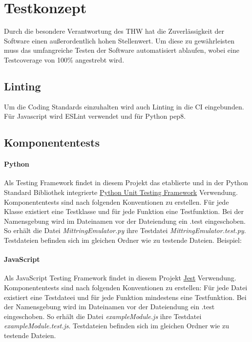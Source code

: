\section{Testkonzept}
Durch die besondere Verantwortung des THW hat die Zuverlässigkeit der Software einen außerordentlich hohen Stellenwert. Um diese zu gewährleisten muss das umfangreiche Testen der Software automatisiert ablaufen, wobei eine Testcoverage von 100\% angestrebt wird.
\subsection{Linting}
Um die Coding Standards einzuhalten wird auch Linting in die CI eingebunden. Für Javascript wird ESLint verwendet und für Python pep8.
\subsection{Komponententests}
\paragraph{Python}
Als Testing Framework findet in diesem Projekt das etablierte und in der Python Standard Bibliothek integrierte \href{https://docs.python.org/3/library/unittest.html}{Python Unit Testing Framework} Verwendung. Komponententests sind nach folgenden Konventionen zu erstellen. Für jede Klasse existiert eine Testklasse und für jede Funktion eine Testfunktion. Bei der Namensgebung wird im Dateinamen vor der Dateiendung ein .test eingeschoben. So erhält die Datei \textit{MittringEmulator.py} ihre Testdatei \textit{MittringEmulator.test.py}. Testdateien befinden sich im gleichen Ordner wie zu testende Dateien. Beispiel:
\paragraph{JavaScript}
Als JavaScript Testing Framework findet in diesem Projekt \href{https://facebook.github.io/jest/docs/en/getting-started.htmll}{Jest} Verwendung. Komponententests sind nach folgenden Konventionen zu erstellen: Für jede Datei existiert eine Testdateei und für jede Funktion mindestens eine Testfunktion. Bei der Namensgebung wird im Dateinamen vor der Dateiendung ein .test eingeschoben. So erhält die Datei \textit{exampleModule.js} ihre Testdatei \textit{exampleModule.test.js}. Testdateien befinden sich im gleichen Ordner wie zu testende Dateien.
